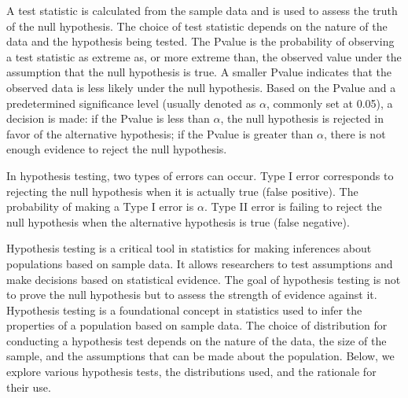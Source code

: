 \documentclass[letterpaper,10pt,english]{jupyterBook}
\begin{document}
\sphinxAtStartPar
A test statistic is calculated from the sample data and is used to assess the truth of the null hypothesis. The choice of test statistic depends on the nature of the data and the hypothesis being tested. The P\sphinxhyphen{}value is the probability of observing a test statistic as extreme as, or more extreme than, the observed value under the assumption that the null hypothesis is true. A smaller P\sphinxhyphen{}value indicates that the observed data is less likely under the null hypothesis. Based on the P\sphinxhyphen{}value and a predetermined significance level (usually denoted as \(\alpha\), commonly set at 0.05), a decision is made: if the P\sphinxhyphen{}value is less than \(\alpha\), the null hypothesis is rejected in favor of the alternative hypothesis; if the P\sphinxhyphen{}value is greater than \(\alpha\), there is not enough evidence to reject the null hypothesis.

\sphinxAtStartPar
In hypothesis testing, two types of errors can occur. Type I error corresponds to rejecting the null hypothesis when it is actually true (false positive). The probability of making a Type I error is \(\alpha\). Type II error is failing to reject the null hypothesis when the alternative hypothesis is true (false negative).

\sphinxAtStartPar
Hypothesis testing is a critical tool in statistics for making inferences about populations based on sample data. It allows researchers to test assumptions and make decisions based on statistical evidence. The goal of hypothesis testing is not to prove the null hypothesis but to assess the strength of evidence against it. Hypothesis testing is a foundational concept in statistics used to infer the properties of a population based on sample data. The choice of distribution for conducting a hypothesis test depends on the nature of the data, the size of the sample, and the assumptions that can be made about the population. Below, we explore various hypothesis tests, the distributions used, and the rationale for their use.
\end{document}
